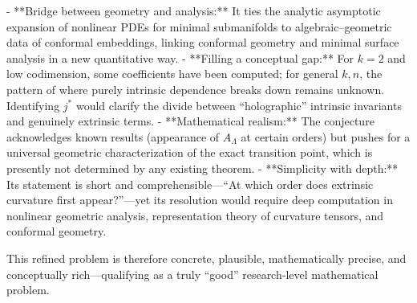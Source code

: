 - **Bridge between geometry and analysis:** It ties the analytic asymptotic expansion of nonlinear PDEs for minimal submanifolds to algebraic–geometric data of conformal embeddings, linking conformal geometry and minimal surface analysis in a new quantitative way.  
- **Filling a conceptual gap:** For \(k=2\) and low codimension, some coefficients have been computed; for general \(k,n\), the pattern of where purely intrinsic dependence breaks down remains unknown. Identifying \(j^*\) would clarify the divide between “holographic” intrinsic invariants and genuinely extrinsic terms.  
- **Mathematical realism:** The conjecture acknowledges known results (appearance of \(A_\Lambda\) at certain orders) but pushes for a universal geometric characterization of the exact transition point, which is presently not determined by any existing theorem.  
- **Simplicity with depth:** Its statement is short and comprehensible—“At which order does extrinsic curvature first appear?”—yet its resolution would require deep computation in nonlinear geometric analysis, representation theory of curvature tensors, and conformal geometry.

This refined problem is therefore concrete, plausible, mathematically precise, and conceptually rich—qualifying as a truly “good” research‑level mathematical problem.